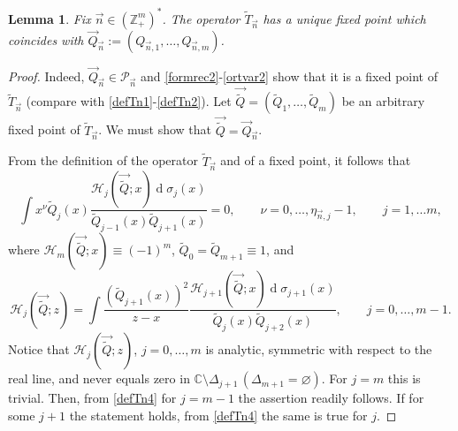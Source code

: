 \documentclass{amsart}
\numberwithin{equation}{section}
\newtheorem{lemma}[theorem]{Lemma}
\theoremstyle{definition}
\DeclareMathOperator{\D}{d}        %
\newcommand{\ZZ}{\mathbb{Z}}      %
\newcommand{\CC}{\mathbb{C}}      %
\newcommand{\n}{\vec{n}}          %
\begin{document}
    \begin{lemma}
        \label{unicoQn}
        Fix $\n \in (\ZZ_+^m)^*$. The operator $\tilde{T}_{\n}$ has a unique fixed point which coincides with $\vec{Q}_{\n} := (Q_{\n,1},\ldots,Q_{\n,m})$.
    \end{lemma}

    \begin{proof}
    Indeed, $\vec{Q}_{\n} \in \mathcal{P}_{\n}$ and \eqref{formrec2}-\eqref{ortvar2} show that it is a fixed point of $\tilde{T}_{\n}$ (compare with \eqref{defTn1}-\eqref{defTn2}). Let $\vec{\tilde{Q}} = (\tilde{Q}_1,\ldots,\tilde{Q}_m)$ be an arbitrary fixed point of $\tilde{T}_{\n}$. We must show that $\vec{\tilde{Q}}  = \vec{Q}_{\n}$.

    From the definition of the operator $\tilde{T}_{\n}$ and of a fixed point, it follows that
    \begin{equation}
        \label{defTn3}
        \int x^\nu \tilde{Q}_{j} (x)\frac{\mathcal{H}_{j}( {\vec{\tilde{Q}}};x) \D \sigma_{j}(x)}{ \tilde{Q}_{j-1}(x) \tilde{Q}_{j+1}(x)} =0,\qquad \nu=0,\ldots,\eta_{\n,j} -1, \qquad j=1,\ldots m,
    \end{equation}
    where $\mathcal{H}_{m}({\vec{\tilde{Q}}};x) \equiv (-1)^m$, $\tilde{Q}_0 = \tilde{{Q}}_{m+1} \equiv 1$, and
    \begin{equation}
    	\label{defTn4}
        \mathcal{H}_{j}( {\vec{\tilde{Q}}};z) = \int \frac{(\tilde{Q}_{j+1}(x))^2}{z-x}\frac{\mathcal{H}_{j+1}( {\vec{\tilde{Q}}};x)\D\sigma_{j+1}(x)}{ \tilde{Q}_{j}(x) \tilde{Q}_{j+2}(x)}, \qquad j=0,\ldots,m-1.
    \end{equation}
    Notice that $\mathcal{H}_{j}( {\vec{\tilde{Q}}};z)$, $j=0,\ldots,m$ is analytic, symmetric with respect to the real line, and never equals zero in $\CC \setminus \Delta_{j+1}\, (\Delta_{m+1} = \varnothing)$. For $j=m$ this is trivial. Then, from \eqref{defTn4} for $j=m-1$ the assertion readily follows. If for some $j+1$ the statement holds, from \eqref{defTn4} the same is true for $j$.



\end{proof}
\end{document}
